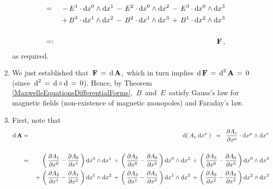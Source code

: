 \begin{enumerate}
\begin{eqnarray*}
	\\ \\
	& = &
		\,-\,
		E^{1} \cdot \textnormal{d} x^{0} \wedge \textnormal{d} x^{1}
		\,-\,
		E^{2} \cdot \textnormal{d} x^{0} \wedge \textnormal{d} x^{2}
		\,-\,
		E^{3} \cdot \textnormal{d} x^{0} \wedge \textnormal{d} x^{3}
	\\
	&&
		\,+\,
		B^{3} \cdot \textnormal{d} x^{1} \wedge \textnormal{d} x^{2}
		\,-\,
		B^{2} \cdot \textnormal{d} x^{1} \wedge \textnormal{d} x^{3}
		\,+\,
		B^{1} \cdot \textnormal{d} x^{2} \wedge \textnormal{d} x^{3}
	\\ \\
	& =: &
		\mathbf{F}\,,
	\end{eqnarray*}
	as required.
\item
	We just established that
	\,$\mathbf{F} \, = \, \textnormal{d}\,\mathbf{A}$,\,
	which in turn implies
	\,$\textnormal{d}\,\mathbf{F} \, = \, \textnormal{d}^{2}\,\mathbf{A} \, = \, 0$\,
	(since \,$\textnormal{d}^{2} \, = \, \textnormal{d} \circ \textnormal{d} \, = \, 0$).
	Hence, by Theorem \ref{MaxwellsEquationsDifferentialForms},
	\,$B$\, and \,$E$\, satisfy
	Gauss's law for magnetic fields (non-existence of magnetic monopoles) and Faraday's law.
\item
	First, note that
	\begin{eqnarray*}
	\d\,\mathbf{A}
	& = &
		\d\!\left(\,A_{\nu}\,\d x^{\nu}\,\right)
	\;\; = \;\;
		\dfrac{\partial A_{\nu}}{\partial x^{\mu}} \cdot \d x^{\mu} \wedge \d x^{\nu}
	\\ \\
	& = &
		\,{\color{white}+}\,
		\left(\,\dfrac{\partial A_{1}}{\partial x^{0}} - \dfrac{\partial A_{0}}{\partial x^{1}}\,\right)\d x^{0} \wedge \d x^{1}
		\,+\,
		\left(\,\dfrac{\partial A_{2}}{\partial x^{0}} - \dfrac{\partial A_{0}}{\partial x^{2}}\,\right)\d x^{0} \wedge \d x^{2}
		\,+\,
		\left(\,\dfrac{\partial A_{3}}{\partial x^{0}} - \dfrac{\partial A_{0}}{\partial x^{3}}\,\right)\d x^{0} \wedge \d x^{3}
	\\
	&&
		\,+\,
		\left(\,\dfrac{\partial A_{2}}{\partial x^{1}} - \dfrac{\partial A_{1}}{\partial x^{2}}\,\right)\d x^{1} \wedge \d x^{2}
		\,+\,
		\left(\,\dfrac{\partial A_{3}}{\partial x^{1}} - \dfrac{\partial A_{1}}{\partial x^{3}}\,\right)\d x^{1} \wedge \d x^{3}
		\,+\,
		\left(\,\dfrac{\partial A_{3}}{\partial x^{2}} - \dfrac{\partial A_{2}}{\partial x^{3}}\,\right)\d x^{2} \wedge \d x^{3}

\end{eqnarray*}
\end{enumerate}
